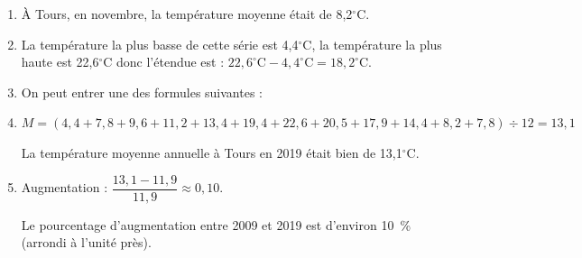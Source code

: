 
\begin{enumerate}[itemsep=1em]
   \item À Tours, en novembre, la température moyenne était de 8,2$^\circ$C.

    \item La température la plus basse de cette série est 4,4$^\circ$C, la température la plus haute est 22,6$^\circ$C donc l'étendue est : $22,6^\circ\text{C}-4,4^\circ\text{C}=18,2^\circ\text{C}$.
    
    \item On peut entrer une des formules suivantes : 
     
    
    \item $M = (4,4+7,8+9,6+11,2+13,4+19,4+22,6+20,5+17,9+14,4+8,2+7,8)\div12=13,1$
    
    \medskip
    La température  moyenne annuelle à Tours en 2019 était bien de 13,1$^\circ$C.
    
    \item Augmentation : $\dfrac{13,1-11,9}{11,9}\approx0,10$. 
    
    \medskip
    Le pourcentage d'augmentation entre 2009 et 2019 est d'environ 10~\% (arrondi à l'unité près).
\end{enumerate}

\medskip

